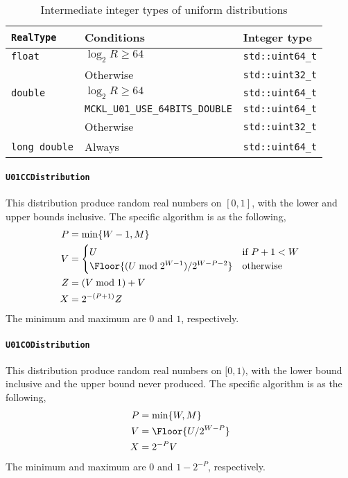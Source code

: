 \begin{table}
  \begin{tabularx}{\textwidth}{LlL}
    \toprule
    \verb|RealType| & Conditions & Integer type \\
    \midrule
    \verb|float| & $\log_2 R \ge 64$ & \verb|std::uint64_t| \\
                 & Otherwise         & \verb|std::uint32_t| \\
    \verb|double| & $\log_2 R \ge 64$ & \verb|std::uint64_t| \\
    & \verb|MCKL_U01_USE_64BITS_DOUBLE| & \verb|std::uint64_t| \\
    & Otherwise & \verb|std::uint32_t| \\
    \verb|long double| & Always & \verb|std::uint64_t| \\
    \bottomrule
  \end{tabularx}
  \caption{Intermediate integer types of uniform distributions}
  \label{tab:Intermediate integer types of uniform distributions}
\end{table}

\paragraph{\texttt{U01CCDistribution}}

This distribution produce random real numbers on $[0, 1]$, with the lower and
upper bounds inclusive. The specific algorithm is as the following,
\begin{align*}
  P &= \min\{W - 1, M\} \\
  V &= \begin{cases}
    U &\text{if } P + 1 < W \\
    \Floor{(U \bmod 2^{W - 1}) / 2^{W - P -2}} &\text{otherwise}
  \end{cases} \\
  Z &= (V \bmod 1) + V \\
  X &= 2^{-(P + 1)} Z
\end{align*}
The minimum and maximum are $0$ and $1$, respectively.

\paragraph{\texttt{U01CODistribution}}

This distribution produce random real numbers on $[0, 1)$, with the lower bound
inclusive and the upper bound never produced. The specific algorithm is as the
following,
\begin{align*}
  P &= \min\{W, M\} \\
  V &= \Floor{U / 2^{W - P}} \\
  X &= 2^{-P} V
\end{align*}
The minimum and maximum are $0$ and $1 - 2^{-P}$, respectively.

